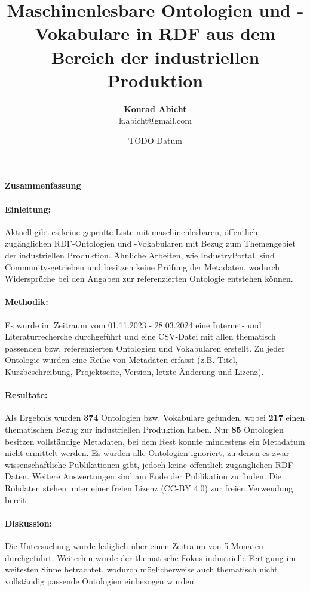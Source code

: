 \documentclass{article}
\title{Maschinenlesbare Ontologien und -Vokabulare in RDF aus dem Bereich der industriellen Produktion}
\author{\textbf{Konrad Abicht} \\ k.abicht@gmail.com}
\date{TODO Datum}
\begin{document}
\maketitle

\paragraph{{\large Zusammenfassung}}

\paragraph{Einleitung:} Aktuell gibt es keine geprüfte Liste mit maschinenlesbaren, öffentlich-zugänglichen RDF-Ontologien und -Vokabularen mit Bezug zum Themengebiet der industriellen Produktion. Ähnliche Arbeiten, wie IndustryPortal, sind Community-getrieben und besitzen keine Prüfung der Metadaten, wodurch Widersprüche bei den Angaben zur referenzierten Ontologie entstehen können.

\paragraph{Methodik:} Es wurde im Zeitraum vom 01.11.2023 - 28.03.2024 eine Internet- und Literaturrecherche durchgeführt und eine CSV-Datei mit allen thematisch passenden bzw. referenzierten Ontologien und Vokabularen erstellt. Zu jeder Ontologie wurden eine Reihe von Metadaten erfasst (z.B. Titel, Kurzbeschreibung, Projektseite, Version, letzte Änderung und Lizenz).

\paragraph{Resultate:} Als Ergebnis wurden \textbf{374} Ontologien bzw. Vokabulare gefunden, wobei \textbf{217} einen thematischen Bezug zur industriellen Produktion haben. Nur \textbf{85} Ontologien besitzen vollständige Metadaten, bei dem Rest konnte mindestens ein Metadatum nicht ermittelt werden. Es wurden alle Ontologien ignoriert, zu denen es zwar wissenschaftliche Publikationen gibt, jedoch keine öffentlich zugänglichen RDF-Daten. Weitere Auswertungen sind am Ende der Publikation zu finden. Die Rohdaten stehen unter einer freien Lizenz (CC-BY 4.0) zur freien Verwendung bereit.

\paragraph{Diskussion:} Die Untersuchung wurde lediglich über einen Zeitraum von 5 Monaten durchgeführt. Weiterhin wurde der thematische Fokus industrielle Fertigung im weitesten Sinne betrachtet, wodurch möglicherweise auch thematisch nicht vollständig passende Ontologien einbezogen wurden.
\end{document}
